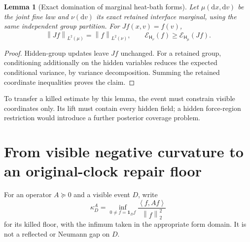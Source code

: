 \documentclass[11pt,oneside,openany]{book}
\newtheorem{lemma}[lemma]{Lemma}
\theoremstyle{definition}
\theoremstyle{remark}
\newcommand{\one}{\mathbf1}
\newcommand{\dd}{\mathrm d}
\newcommand{\norm}[1]{\left\lVert#1\right\rVert}
\newcommand{\ip}[2]{\left\langle#1,#2\right\rangle}
\begin{document}
\begin{lemma}[Exact domination of marginal heat-bath forms]
\label{lem:marginal-form-domination}
Let $\mu(\dd x,\dd v)$ be the joint fine law and $\nu(\dd v)$ its
exact retained interface marginal, using the same independent group
partition. For $Jf(x,v)=f(v)$,
\[
 \norm{Jf}_{L^2(\mu)}=\norm f_{L^2(\nu)},\qquad
 \mathcal E_{\mathsf H_\nu}(f)\ge
                         \mathcal E_{\mathsf H_\mu}(Jf).
\]
\end{lemma}
\begin{proof}
Hidden-group updates leave $Jf$ unchanged. For a retained group,
conditioning additionally on the hidden variables reduces the expected
conditional variance, by variance decomposition. Summing the retained
coordinate inequalities proves the claim.
\end{proof}
To transfer a killed estimate by this lemma, the event must constrain
visible coordinates only. Its lift must contain every hidden field;
a hidden force-region restriction would introduce a further posterior
coverage problem.

\section{From visible negative curvature to an original-clock repair floor}
\label{sec:repair-transfer}
For an operator $A\succeq0$ and a visible event $D$, write
\[
 \kappa_D^A=\inf_{0\ne f=\one_Df}
                 \frac{\ip f{Af}}{\norm f_2^2}
\]
for its killed floor, with the infimum taken in the appropriate form
domain. It is not a reflected or Neumann gap on $D$.
\end{document}
